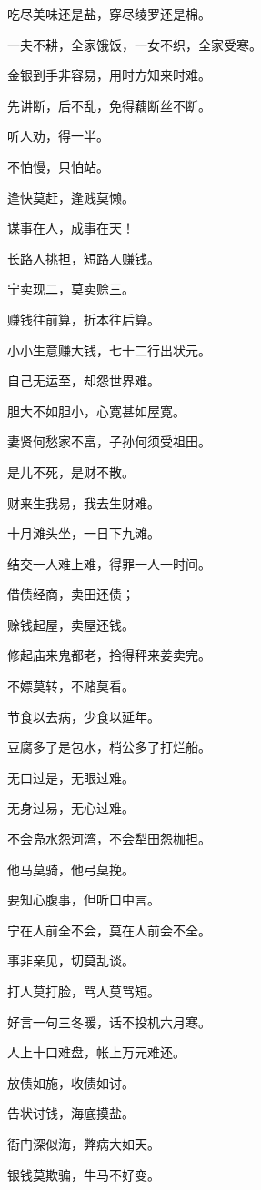 \documentclass[12pt,oneside]{book}
\begin{document}
吃尽美味还是盐，穿尽绫罗还是棉。

一夫不耕，全家饿饭，一女不织，全家受寒。

金银到手非容易，用时方知来时难。

先讲断，后不乱，免得藕断丝不断。

听人劝，得一半。

不怕慢，只怕站。

逢快莫赶，逢贱莫懒。

谋事在人，成事在天！

长路人挑担，短路人赚钱。

宁卖现二，莫卖赊三。

赚钱往前算，折本往后算。

小小生意赚大钱，七十二行出状元。

自己无运至，却怨世界难。

胆大不如胆小，心寛甚如屋寛。

妻贤何愁家不富，子孙何须受祖田。

是儿不死，是财不散。

财来生我易，我去生财难。

十月滩头坐，一日下九滩。

结交一人难上难，得罪一人一时间。

借债经商，卖田还债；

赊钱起屋，卖屋还钱。

修起庙来鬼都老，拾得秤来姜卖完。

不嫖莫转，不赌莫看。

节食以去病，少食以延年。

豆腐多了是包水，梢公多了打烂船。

无口过是，无眼过难。

无身过易，无心过难。

不会凫水怨河湾，不会犁田怨枷担。

他马莫骑，他弓莫挽。

要知心腹事，但听口中言。

宁在人前全不会，莫在人前会不全。

事非亲见，切莫乱谈。

打人莫打脸，骂人莫骂短。

好言一句三冬暖，话不投机六月寒。

人上十口难盘，帐上万元难还。

放债如施，收债如讨。

告状讨钱，海底摸盐。

衙门深似海，弊病大如天。

银钱莫欺骗，牛马不好变。
\end{document}
